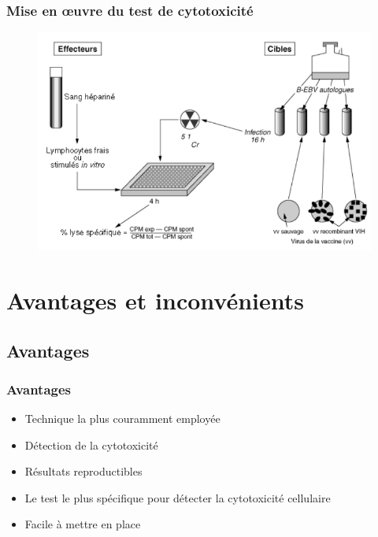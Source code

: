 \documentclass[12pt]{beamer}
\begin{document}
 \begin{frame}
   \frametitle{Mise en \oe{}uvre du test de cytotoxicité}
	 \begin{figure}
       \includegraphics[width=0.7\linewidth]{presentation.png}
	 \end{figure}
  
 \end{frame}


\section{Avantages et inconvénients}
\subsection{Avantages}
\begin{frame}
  \transuncover
  \frametitle{Avantages}

  \begin{itemize}
  \item Technique la plus couramment employée
  \item Détection de la cytotoxicité
  \item Résultats reproductibles
  \item Le test le plus spécifique pour détecter la cytotoxicité cellulaire
  \item Facile à mettre en place
  \end{itemize}

\end{frame}
\end{document}
